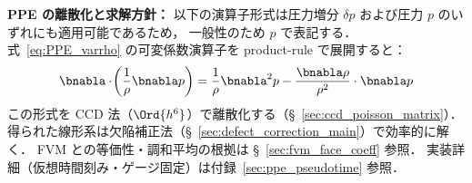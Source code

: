 \noindent\textbf{PPE の離散化と求解方針：}
以下の演算子形式は圧力増分 $\delta p$ および圧力 $p$ のいずれにも適用可能であるため，
一般性のため $p$ で表記する．
式~\eqref{eq:PPE_varrho} の可変係数演算子を product-rule で展開すると：
\begin{equation}
  \bnabla\cdot\!\left(\frac{1}{\rho}\bnabla p\right)
  = \frac{1}{\rho}\bnabla^2 p - \frac{\bnabla\rho}{\rho^2}\cdot\bnabla p
  \label{eq:varrho_product_rule}
\end{equation}
この形式を CCD 法（$\Ord{h^6}$）で離散化する（§~\ref{sec:ccd_poisson_matrix}）．
得られた線形系は欠陥補正法（§~\ref{sec:defect_correction_main}）で効率的に解く．
FVM との等価性・調和平均の根拠は §~\ref{sec:fvm_face_coeff} 参照．
実装詳細（仮想時間刻み・ゲージ固定）は付録~\ref{sec:ppe_pseudotime} 参照．
